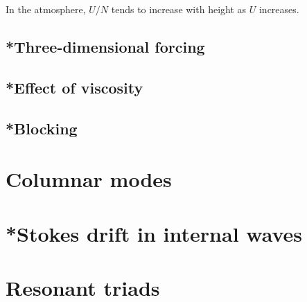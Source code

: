 In the atmosphere, $U/N$ tends to increase with height as $U$ increases.

\subsection{*Three-dimensional forcing}
\subsection{*Effect of viscosity}
\subsection{*Blocking}

\section{Columnar modes}
\section{*Stokes drift in internal waves}
\section{Resonant triads}
